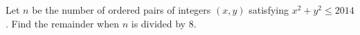 Let $n$ be the number of ordered pairs of integers $(x,y)$ satisfying $x^2+y^2\le2014$. Find the remainder when $n$ is divided by $8$.
